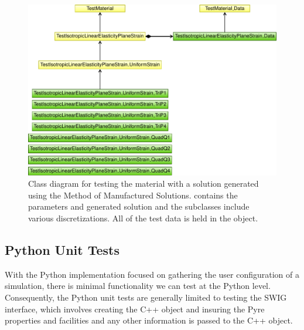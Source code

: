 

\begin{figure}[htbp]
  \includegraphics[scale=0.8]{developer/figs/testmaterial_classdiagram}
  \caption{Class diagram for testing the
     material with a
    solution generated using the Method of Manufactured
    Solutions. 
    contains the parameters and generated solution and the subclasses
    include various discretizations. All of the test data is held in
    the 
    object.}
  \label{fig:developer:test:material:class}
\end{figure}


\subsection{Python Unit Tests}

With the Python implementation focused on gathering the user configuration of a simulation, there is
minimal functionality we can test at the Python level. Consequently, the Python unit tests are generally
limited to testing the SWIG interface, which involves creating the C++ object and insuring the Pyre
properties and facilities and any other information is passed to the C++ object.


